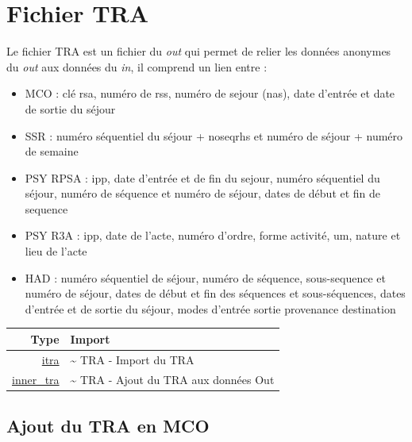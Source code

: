 \documentclass[
]{book}
\providecommand{\tightlist}{%
  \setlength{\itemsep}{0pt}\setlength{\parskip}{0pt}}
\begin{document}
\hypertarget{fichier-tra}{%
\chapter{Fichier TRA}\label{fichier-tra}}

Le fichier TRA est un fichier du \emph{out} qui permet de relier les données anonymes du \emph{out} aux données du \emph{in}, il comprend un lien entre :

\begin{itemize}
\tightlist
\item
  MCO : clé rsa, numéro de rss, numéro de sejour (nas), date d'entrée et date de sortie du séjour
\item
  SSR : numéro séquentiel du séjour + noseqrhs et numéro de séjour + numéro de semaine
\item
  PSY RPSA : ipp, date d'entrée et de fin du sejour, numéro séquentiel du séjour, numéro de séquence et numéro de séjour, dates de début et fin de sequence
\item
  PSY R3A : ipp, date de l'acte, numéro d'ordre, forme activité, um, nature et lieu de l'acte
\item
  HAD : numéro séquentiel de séjour, numéro de séquence, sous-sequence et numéro de séjour, dates de début et fin des séquences et sous-séquences, dates d'entrée et de sortie du séjour, modes d'entrée sortie provenance destination
\end{itemize}

\begin{longtable}[]{@{}rl@{}}
\toprule
Type & Import \\
\midrule
\endhead
\href{https://im-aphp.github.io/pmeasyr/reference/itra.html}{itra} & \textasciitilde{} TRA - Import du TRA \\
\href{https://im-aphp.github.io/pmeasyr/reference/inner_tra.html}{inner\_tra} & \textasciitilde{} TRA - Ajout du TRA aux données Out \\
\bottomrule
\end{longtable}

\hypertarget{ajout-du-tra-en-mco}{%
\section{Ajout du TRA en MCO}\label{ajout-du-tra-en-mco}}
\end{document}
